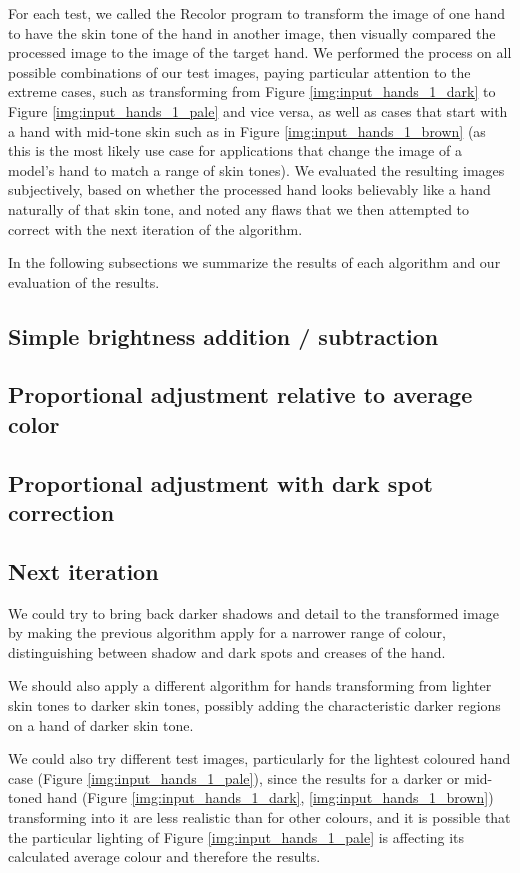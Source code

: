  For each test, we called the Recolor program to transform the image of one hand to have the skin tone of the hand in another image, then visually compared the processed image to the image of the target hand. We performed the process on all possible combinations of our test images, paying particular attention to the extreme cases, such as transforming from Figure \ref{img:input_hands_1_dark} to Figure \ref{img:input_hands_1_pale} and vice versa, as well as cases that start with a hand with mid-tone skin such as in Figure \ref{img:input_hands_1_brown} (as this is the most likely use case for applications that change the image of a model's hand to match a range of skin tones). We evaluated the resulting images subjectively, based on whether the processed hand looks believably like a hand naturally of that skin tone, and noted any flaws that we then attempted to correct with the next iteration of the algorithm.

In the following subsections we summarize the results of each algorithm and our evaluation of the results.

\subsection{Simple brightness addition / subtraction}


\subsection{Proportional adjustment relative to average color}


\subsection{Proportional adjustment with dark spot correction}


\subsection{Next iteration}
We could try to bring back darker shadows and detail to the transformed image by making the previous algorithm apply for a narrower range of colour, distinguishing between shadow and dark spots and creases of the hand. 

We should also apply a different algorithm for hands transforming from lighter skin tones to darker skin tones, possibly adding the characteristic darker regions on a hand of darker skin tone.

We could also try different test images, particularly for the lightest coloured hand case (Figure \ref{img:input_hands_1_pale}), since the results for a darker or mid-toned hand (Figure \ref{img:input_hands_1_dark}, \ref{img:input_hands_1_brown}) transforming into it are less realistic than for other colours, and it is possible that the particular lighting of Figure \ref{img:input_hands_1_pale} is affecting its calculated average colour and therefore the results.